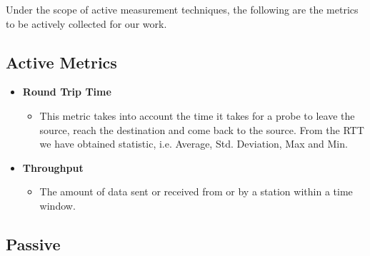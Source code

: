 Under the scope of active measurement techniques, the following are the metrics to be actively collected for our work.

\subsection*{Active Metrics}

\begin{itemize}
	\item \textbf{Round Trip Time}
	\begin{itemize}
		\item This metric takes into account the time it takes for a probe to leave the source, reach the destination and come back to the source. From the RTT we have obtained statistic, i.e. Average, Std. Deviation, Max and Min.
	\end{itemize}
	
	\item \textbf{Throughput}
	\begin{itemize}
		\item The amount of data sent or received from or by a station within a time window. 
	\end{itemize}
\end{itemize}

\subsection*{Passive}

